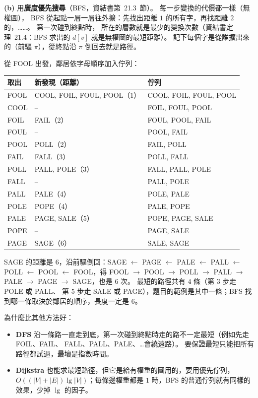 \begin{pastsoln}
\textbf{(b)} 用\textbf{廣度優先搜尋}（BFS，資結書第~21.3~節）。 每一步變換的代價都一樣（無權圖），
BFS 從起點一層一層往外擴：先找出距離 $1$ 的所有字，再找距離 $2$ 的，……。 第一次碰到終點時，
所在的層數就是最少的變換次數（資結書定理~21.4：BFS 求出的 $d[v]$ 就是無權圖的最短距離）。
記下每個字是從誰擴出來的（前驅 $\pi$），從終點沿 $\pi$ 倒回去就是路徑。

從 FOOL 出發，鄰居依字母順序加入佇列：
\begin{center}
\begin{tabular}{lll}
\toprule
取出 & 新發現（距離） & 佇列 \\
\midrule
FOOL & COOL, FOIL, FOUL, POOL（1） & COOL, FOIL, FOUL, POOL \\
COOL & -- & FOIL, FOUL, POOL \\
FOIL & FAIL（2） & FOUL, POOL, FAIL \\
FOUL & -- & POOL, FAIL \\
POOL & POLL（2） & FAIL, POLL \\
FAIL & FALL（3） & POLL, FALL \\
POLL & PALL, POLE（3） & FALL, PALL, POLE \\
FALL & -- & PALL, POLE \\
PALL & PALE（4） & POLE, PALE \\
POLE & POPE（4） & PALE, POPE \\
PALE & PAGE, SALE（5） & POPE, PAGE, SALE \\
POPE & -- & PAGE, SALE \\
PAGE & SAGE（6） & SALE, SAGE \\
\bottomrule
\end{tabular}
\end{center}
SAGE 的距離是 $6$，沿前驅倒回：SAGE $\leftarrow$ PAGE $\leftarrow$ PALE $\leftarrow$ PALL
$\leftarrow$ POLL $\leftarrow$ POOL $\leftarrow$ FOOL，得 FOOL $\to$ POOL $\to$ POLL $\to$ PALL
$\to$ PALE $\to$ PAGE $\to$ SAGE，也是 $6$ 次。 最短的路徑共有 $4$ 條（第 $3$ 步走 POLE 或 PALL、
第 $5$ 步走 SALE 或 PAGE），題目的範例是其中一條；BFS 找到哪一條取決於鄰居的順序，長度一定是 $6$。

為什麼比其他方法好：
\begin{itemize}
\item \textbf{DFS} 沿一條路一直走到底，第一次碰到終點時走的路不一定最短（例如先走 FOIL、FAIL、
FALL、PALL、PALE、\ldots 會繞遠路）。 要保證最短只能把所有路徑都試過，最壞是指數時間。
\item \textbf{Dijkstra} 也能求最短路徑，但它是給有權重的圖用的，要用優先佇列，
$O((|V| + |E|)\lg|V|)$；每條邊權重都是 $1$ 時，BFS 的普通佇列就有同樣的效果，少掉 $\lg$ 的因子。
\end{itemize}


\end{pastsoln}
